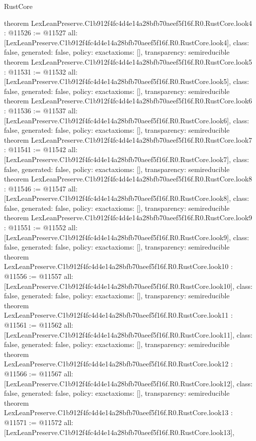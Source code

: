 \begin{lexlean}{RustCore}
\begin{coremodule}
{}
theorem LexLeanPreserve.C1b912f4fc4d4e14a28bfb70aeef5f16f.R0.RustCore.look4 : @11526 := @11527 {
  all: [LexLeanPreserve.C1b912f4fc4d4e14a28bfb70aeef5f16f.R0.RustCore.look4],
  class: false,
  generated: false,
  policy: exact{axioms: []},
  transparency: semireducible
}
theorem LexLeanPreserve.C1b912f4fc4d4e14a28bfb70aeef5f16f.R0.RustCore.look5 : @11531 := @11532 {
  all: [LexLeanPreserve.C1b912f4fc4d4e14a28bfb70aeef5f16f.R0.RustCore.look5],
  class: false,
  generated: false,
  policy: exact{axioms: []},
  transparency: semireducible
}
theorem LexLeanPreserve.C1b912f4fc4d4e14a28bfb70aeef5f16f.R0.RustCore.look6 : @11536 := @11537 {
  all: [LexLeanPreserve.C1b912f4fc4d4e14a28bfb70aeef5f16f.R0.RustCore.look6],
  class: false,
  generated: false,
  policy: exact{axioms: []},
  transparency: semireducible
}
theorem LexLeanPreserve.C1b912f4fc4d4e14a28bfb70aeef5f16f.R0.RustCore.look7 : @11541 := @11542 {
  all: [LexLeanPreserve.C1b912f4fc4d4e14a28bfb70aeef5f16f.R0.RustCore.look7],
  class: false,
  generated: false,
  policy: exact{axioms: []},
  transparency: semireducible
}
theorem LexLeanPreserve.C1b912f4fc4d4e14a28bfb70aeef5f16f.R0.RustCore.look8 : @11546 := @11547 {
  all: [LexLeanPreserve.C1b912f4fc4d4e14a28bfb70aeef5f16f.R0.RustCore.look8],
  class: false,
  generated: false,
  policy: exact{axioms: []},
  transparency: semireducible
}
theorem LexLeanPreserve.C1b912f4fc4d4e14a28bfb70aeef5f16f.R0.RustCore.look9 : @11551 := @11552 {
  all: [LexLeanPreserve.C1b912f4fc4d4e14a28bfb70aeef5f16f.R0.RustCore.look9],
  class: false,
  generated: false,
  policy: exact{axioms: []},
  transparency: semireducible
}
theorem LexLeanPreserve.C1b912f4fc4d4e14a28bfb70aeef5f16f.R0.RustCore.look10 : @11556 := @11557 {
  all: [LexLeanPreserve.C1b912f4fc4d4e14a28bfb70aeef5f16f.R0.RustCore.look10],
  class: false,
  generated: false,
  policy: exact{axioms: []},
  transparency: semireducible
}
theorem LexLeanPreserve.C1b912f4fc4d4e14a28bfb70aeef5f16f.R0.RustCore.look11 : @11561 := @11562 {
  all: [LexLeanPreserve.C1b912f4fc4d4e14a28bfb70aeef5f16f.R0.RustCore.look11],
  class: false,
  generated: false,
  policy: exact{axioms: []},
  transparency: semireducible
}
theorem LexLeanPreserve.C1b912f4fc4d4e14a28bfb70aeef5f16f.R0.RustCore.look12 : @11566 := @11567 {
  all: [LexLeanPreserve.C1b912f4fc4d4e14a28bfb70aeef5f16f.R0.RustCore.look12],
  class: false,
  generated: false,
  policy: exact{axioms: []},
  transparency: semireducible
}
theorem LexLeanPreserve.C1b912f4fc4d4e14a28bfb70aeef5f16f.R0.RustCore.look13 : @11571 := @11572 {
  all: [LexLeanPreserve.C1b912f4fc4d4e14a28bfb70aeef5f16f.R0.RustCore.look13],
}
\end{coremodule}
\end{lexlean}
